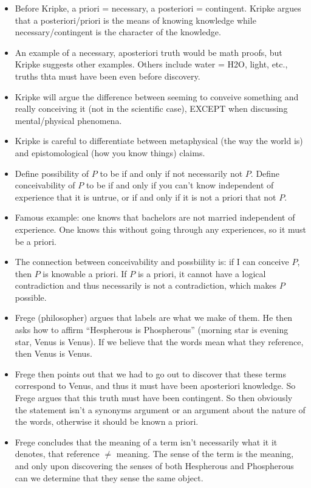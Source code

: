 \documentclass{report}
\begin{document}
\begin{itemize}
\item Before Kripke, a priori = necessary, a posteriori = contingent. Kripke argues that a posteriori/priori is the means of knowing knowledge while necessary/contingent is the character of the knowledge.
\item An example of a necessary, aposteriori truth would be math proofs, but Kripke suggests other examples. Others include water = H2O, light, etc., truths thta must have been even before discovery.
\item Kripke will argue the difference between seeming to conveive something and really conceiving it (not in the scientific case), EXCEPT when discussing mental/physical phenomena.
\item Kripke is careful to differentiate between metaphysical (the way the world is) and epistomological (how you know things) claims.
\item Define possibility of $P$ to be if and only if not necessarily not $P$. Define conceivability of $P$ to be if and only if you can't know independent of experience that it is untrue, or if and only if it is not a priori that not $P$.
\item Famous example: one knows that bachelors are not married independent of experience. One knows this without going through any experiences, so it must be a priori. 
\item The connection between conceivability and possbiility is: if I can conceive $P$, then $P$ is knowable a priori. If $P$ is a priori, it cannot have a logical contradiction and thus necessarily is not a contradiction, which makes $P$ possible. 
\item Frege (philosopher) argues that labels are what we make of them. He then asks how to affirm ``Hespherous is Phospherous'' (morning star is evening star, Venus is Venus). If we believe that the words mean what they reference, then Venus is Venus. 
\item Frege then points out that we had to go out to discover that these terms correspond to Venus, and thus it must have been aposteriori knowledge. So Frege argues that this truth must have been contingent. So then obviously the statement isn't a synonyms argument or an argument about the nature of the words, otherwise it should be known a priori. 
\item Frege concludes that the meaning of a term isn't necessarily what it it denotes, that reference $\neq$ meaning. The sense of the term is the meaning, and only upon discovering the senses of both Hespherous and Phospherous can we determine that they sense the same object.

\end{itemize}
\end{document}
